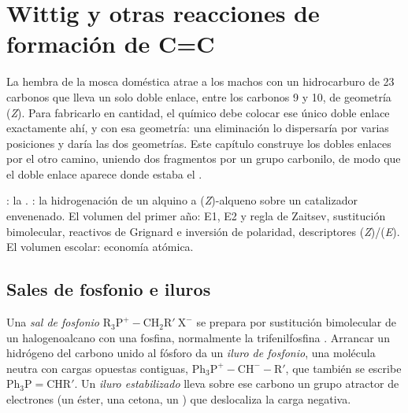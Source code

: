 \chapter{Wittig y otras reacciones de formación de C=C}\label{ch:b2:wittig}

La hembra de la mosca doméstica atrae a los machos con un hidrocarburo de 23 carbonos que lleva un solo doble enlace, entre
los carbonos 9 y 10, de geometría (\textit{Z}). Para fabricarlo en cantidad, el químico debe colocar ese único
doble enlace exactamente ahí, y con esa geometría: una eliminación lo dispersaría por varias
posiciones y daría las dos geometrías. Este capítulo construye los dobles enlaces por el otro camino, uniendo dos
fragmentos por un grupo carbonilo, de modo que el doble enlace aparece donde estaba el .

\begin{recall}
: la . : la hidrogenación de
un alquino a (\textit{Z})-alqueno sobre un catalizador envenenado. El volumen del primer año: E1, E2 y regla de
Zaitsev, sustitución bimolecular, reactivos de Grignard e inversión de polaridad, descriptores
(\textit{Z})/(\textit{E}). El volumen escolar: economía atómica.
\end{recall}

\section{Sales de fosfonio e iluros}

\begin{definition}\label{def:b2:wittig:ylide}
Una \emph{sal de fosfonio} $\mathrm{R_3P^+{-}CH_2R'\ X^-}$ se prepara por sustitución
bimolecular de un halogenoalcano con una fosfina, normalmente la trifenilfosfina . Arrancar un
hidrógeno del carbono unido al fósforo da un \emph{iluro de fosfonio},
una molécula neutra con cargas opuestas contiguas, $\mathrm{Ph_3P^+{-}CH^-{-}R'}$, que también se escribe $\mathrm{Ph_3P{=}CHR'}$. Un
\emph{iluro estabilizado} lleva sobre ese carbono un grupo atractor de electrones
(un éster, una cetona, un ) que deslocaliza la carga negativa.
\end{definition}

